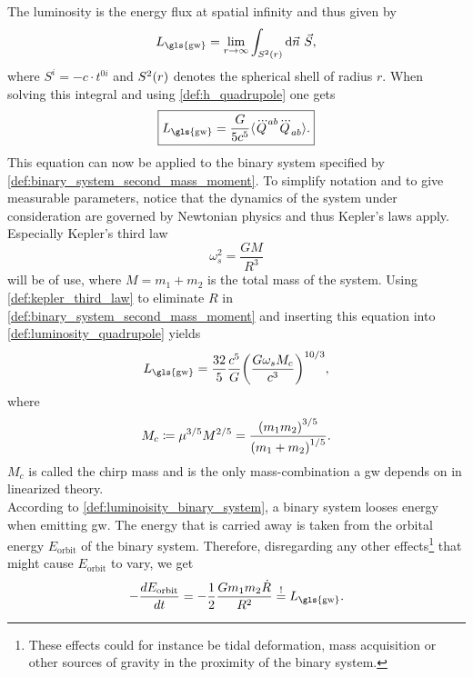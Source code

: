 The luminosity is the energy flux at spatial infinity and thus given by
\begin{equation}
L_\text{\gls{gw}} = \lim_{r\to\infty}\int_{S^2\lr{r}}\diff\vec{n}\ \vec{S},
\end{equation}
where $S^i=-c\cdot t^{0i}$ and $S^2{\left( r \right)}$ denotes the spherical shell of radius $r$. When solving this integral and using \eqref{def:h_quadrupole} one gets
\begin{equation}\label{def:luminosity_quadrupole}
\boxed{L_\text{\gls{gw}}=\frac{G}{5c^5}\langle\dddot{Q}^{ab}\dddot{Q}_{ab}\rangle.}
\end{equation}
This equation can now be applied to the binary system specified by \eqref{def:binary_system_second_mass_moment}. To simplify notation and to give measurable parameters, notice that the dynamics of the system under consideration are governed by Newtonian physics and thus Kepler's laws apply. Especially Kepler's third law
\begin{equation}\label{def:kepler_third_law}
\omega_s^2=\frac{G M}{R^3}
\end{equation}
will be of use, where $M=m_1+m_2$ is the total mass of the system. Using \eqref{def:kepler_third_law} to eliminate $R$ in \eqref{def:binary_system_second_mass_moment} and inserting this equation into \eqref{def:luminosity_quadrupole} yields
\begin{equation}\label{def:luminoisity_binary_system}
L_\text{\gls{gw}}=\frac{32}{5}\frac{c^5}{G}\lr{\frac{G\omega_s M_c}{c^3}}^{10/3},
\end{equation}
where
\begin{equation}
M_c\coloneqq \mu^{3/5}M^{2/5}=\frac{{\left( m_1 m_2 \right)}^{3/5}}{{\left( m_1 + m_2 \right)}^{1/5}}.
\end{equation}
$M_c$ is called the chirp mass and is the only mass-combination a \gls{gw} depends on in linearized theory.\medskip\\
According to \eqref{def:luminoisity_binary_system}, a binary system looses energy when emitting \gls{gw}. The energy that is carried away is taken from the orbital energy $E_\text{orbit}$ of the binary system. Therefore, disregarding any other effects\footnote{These effects could for instance be tidal deformation, mass acquisition or other sources of gravity in the proximity of the binary system.} that might cause $E_\text{orbit}$ to vary, we get
\begin{equation}
-\frac{d E_\text{orbit}}{dt}=-\frac{1}{2}\frac{G m_1 m_2 \dot{R}}{R^2}\mbe L_\text{\gls{gw}}.
\end{equation}
